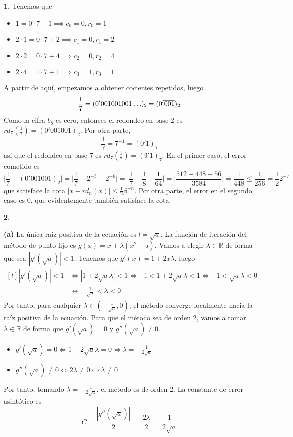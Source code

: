 \documentclass[12pt]{report}
\newcommand{\R}{\mathbb R}
\begin{document}
\textbf{1. } Tenemos que
\begin{itemize}
    \item $1 = 0 \cdot 7 + 1 \implies c_0 = 0, r_0 = 1$
    \item $2 \cdot 1 = 0 \cdot 7 + 2 \implies c_1 = 0, r_1 = 2$
    \item $2 \cdot 2 = 0 \cdot 7 + 4 \implies c_2 = 0, r_2 = 4$
    \item $2 \cdot 4 = 1 \cdot 7 + 1 \implies c_3 = 1, r_3 = 1$
\end{itemize}
A partir de aquí, empezamos a obtener cocientes repetidos, luego
\[\frac{1}{7} = (0'001001001 \mathellipsis)_2 = (0'\overline{001})_2\]
Como la cifra $b_8$ es cero, entonces el redondeo en base 2 es $rd_7(\frac{1}{7}) = (0'001001)_2$. Por otra parte,
\[\frac{1}{7} = 7^{-1} = (0'1)_7\]
así que el redondeo en base 7 es $rd_7(\frac{1}{7}) = (0'1)_7$. En el primer caso, el error cometido es
\[\biggl| \frac{1}{7} - (0'001001)_2 \biggr| = \biggl| \frac{1}{7} - 2^{-3} - 2^{-6} \biggr| = \biggl| \frac{1}{7} - \frac{1}{8} - \frac{1}{64} \biggr| = \biggl| \frac{512-448-56}{3584}\biggr| = \frac{1}{448} \leq \frac{1}{256} = \frac{1}{2}2^{-7}\]
que satisface la cota $|x - rd_n(x)| \leq \frac{1}{2}\beta^{-n}$. Por otra parte, el error en el segundo caso es 0, que evidentemente también satisface la cota.

\vspace{2mm}
\textbf{2. }

\vspace{2mm}
\textbf{(a) } La única raíz positiva de la ecuación es $l = \sqrt{a}$. La función de iteración del método de punto fijo es $g(x) = x + \lambda(x^2 - a)$. Vamos a elegir $\lambda \in \R$ de forma que sea $|g'(\sqrt{a})| < 1$. Tenemos que
$g'(x) = 1 + 2x\lambda$, luego
\[
\begin{aligned}[t]
|g'(\sqrt{a})| < 1 &\iff |1 + 2\sqrt{a}\lambda | <1 \iff -1 < 1+2\sqrt{a}\lambda < 1 \iff -1 < \sqrt{a}\lambda < 0 \\
&\iff -\frac{1}{\sqrt{a}} < \lambda < 0
\end{aligned}
\]
Por tanto, para cualquier $\lambda \in (-\frac{1}{\sqrt{a}},0)$, el método converge localmente hacia la raíz positiva de la ecuación. Para que el método sea de orden 2, vamos a tomar $\lambda \in \R$ de forma que $g'(\sqrt{a}) = 0$ y $g''(\sqrt{a}) \neq 0$.
\begin{itemize}
    \item $\displaystyle g'(\sqrt{a}) = 0 \iff 1 + 2\sqrt{a}\lambda = 0 \iff \lambda = -\frac{1}{2\sqrt{a}}$
    \item $\displaystyle g''(\sqrt{a}) \neq 0 \iff 2\lambda \neq 0 \iff \lambda \neq 0$
\end{itemize}
Por tanto, tomando $\lambda = -\frac{1}{2\sqrt{a}}$, el método es de orden 2. La constante de error asintótico es
\[C = \frac{|g''(\sqrt{a})|}{2} = \frac{|2\lambda|}{2} = \frac{1}{2\sqrt{a}}\]
\end{document}
